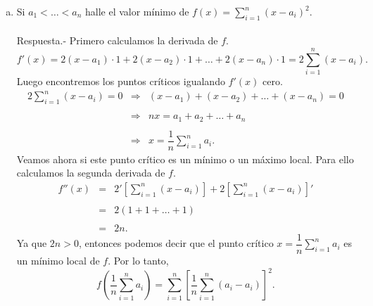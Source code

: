 \begin{enumerate}[\bfseries 1.]
\begin{enumerate}[(a)]
	    \item Si $a_1<\ldots < a_n$ halle el valor mínimo de $f(x)=\sum\limits_{i=1}^n (x-a_i)^2$.\\\\
		Respuesta.-\; Primero calculamos la derivada de $f$.
		$$f'(x)=2(x-a_1)\cdot 1 + 2(x-a_2)\cdot 1 + \ldots + 2(x-a_n)\cdot 1=2\sum\limits_{i=1}^n (x-a_i).$$
		Luego encontremos los puntos críticos igualando $f'(x)$ cero.
		$$\begin{array}{rcl}
		    2\displaystyle\sum_{i=1}^n (x-a_i)=0 &\Rightarrow& (x-a_1)+(x-a_2)+\ldots + (x-a_n) = 0\\\\
							 &\Rightarrow& nx=a_1+a_2+\ldots + a_n\\\\
							 &\Rightarrow& x=\dfrac{1}{n}\displaystyle\sum_{i=1}^n a_i.
		\end{array}$$
		Veamos ahora si este punto crítico es un mínimo o un máximo local. Para ello calculamos la segunda derivada de $f$.
		$$\begin{array}{rcl}
		    f''(x)&=&2'\left[\displaystyle\sum_{i=1}^n (x-a_i)\right]+2\left[\displaystyle\sum_{i=1}^n (x-a_i)\right]'\\\\
			  &=&2(1+1+\ldots +1)\\\\
			  &=&2n.
		\end{array}$$
		Ya que $2n>0$, entonces podemos decir que el punto crítico $x=\dfrac{1}{n}\displaystyle\sum_{i=1}^n a_i$ es un mínimo local de $f$. Por lo tanto,
		$$f\left(\dfrac{1}{n}\sum_{i=1}^n a_i\right)=\sum_{i=1}^n \left[\dfrac{1}{n}\sum_{i=1}^n \left(a_i-a_i\right)\right]^2.$$\\


\end{enumerate}
\end{enumerate}
